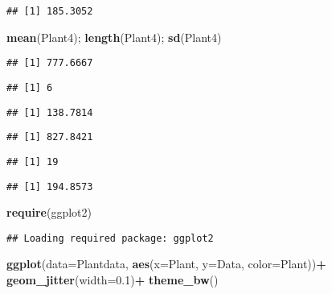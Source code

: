 \documentclass[]{article}
\newenvironment{Shaded}{\begin{snugshade}}{\end{snugshade}}
\newcommand{\KeywordTok}[1]{\textcolor[rgb]{0.13,0.29,0.53}{\textbf{#1}}}
\newcommand{\DataTypeTok}[1]{\textcolor[rgb]{0.13,0.29,0.53}{#1}}
\newcommand{\FloatTok}[1]{\textcolor[rgb]{0.00,0.00,0.81}{#1}}
\newcommand{\StringTok}[1]{\textcolor[rgb]{0.31,0.60,0.02}{#1}}
\newcommand{\OperatorTok}[1]{\textcolor[rgb]{0.81,0.36,0.00}{\textbf{#1}}}
\newcommand{\NormalTok}[1]{#1}
\begin{document}
\begin{verbatim}
## [1] 185.3052
\end{verbatim}

\begin{Shaded}
\begin{Highlighting}[]
\KeywordTok{mean}\NormalTok{(Plant4); }\KeywordTok{length}\NormalTok{(Plant4); }\KeywordTok{sd}\NormalTok{(Plant4)}
\end{Highlighting}
\end{Shaded}

\begin{verbatim}
## [1] 777.6667
\end{verbatim}

\begin{verbatim}
## [1] 6
\end{verbatim}

\begin{verbatim}
## [1] 138.7814
\end{verbatim}

\begin{Shaded}
\end{Shaded}

\begin{verbatim}
## [1] 827.8421
\end{verbatim}

\begin{verbatim}
## [1] 19
\end{verbatim}

\begin{verbatim}
## [1] 194.8573
\end{verbatim}

\begin{Shaded}
\begin{Highlighting}[]
\KeywordTok{require}\NormalTok{(ggplot2)}
\end{Highlighting}
\end{Shaded}

\begin{verbatim}
## Loading required package: ggplot2
\end{verbatim}

\begin{Shaded}
\begin{Highlighting}[]
\KeywordTok{ggplot}\NormalTok{(}\DataTypeTok{data=}\NormalTok{Plantdata, }\KeywordTok{aes}\NormalTok{(}\DataTypeTok{x=}\NormalTok{Plant, }\DataTypeTok{y=}\NormalTok{Data, }\DataTypeTok{color=}\NormalTok{Plant))}\OperatorTok{+}
\StringTok{  }\KeywordTok{geom_jitter}\NormalTok{(}\DataTypeTok{width=}\FloatTok{0.1}\NormalTok{)}\OperatorTok{+}
\StringTok{  }\KeywordTok{theme_bw}\NormalTok{()}
\end{Highlighting}
\end{Shaded}
\end{document}
